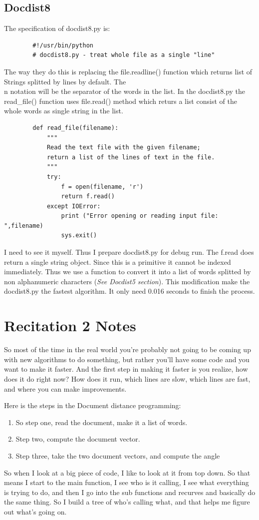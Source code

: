 \documentclass{article}
\begin{document}
    \subsection{Docdist8}
    The specification of docdist8.py is:
    \begin{lstlisting}
        #!/usr/bin/python
        # docdist8.py - treat whole file as a single "line"
    \end{lstlisting}
    The way they do this is replacing the file.readline() function which returns list of Strings splitted by lines by default.
    The \\n notation will be the separator of the words in the list. 
    In the docdist8.py the read\_file() function uses file.read() method which returs a list consist of the whole words as single string in the list. 
    \begin{lstlisting}
        def read_file(filename):
            """ 
            Read the text file with the given filename;
            return a list of the lines of text in the file.
            """
            try:
                f = open(filename, 'r')
                return f.read()
            except IOError:
                print ("Error opening or reading input file: ",filename)
                sys.exit()
    \end{lstlisting}
    I need to see it myself. Thus I prepare docdist8.py for debug run. 
    The f.read does return a single string object. Since this is a primitive it cannot be indexed immediately.
    Thus we use a function to convert it into a list of words splitted by non alphanumeric characters (\textit{See Docdist5 section}).
    This modification make the docdist8.py the fastest algorithm. It only need 0.016 seconds to finish the process.

    \section{Recitation 2 Notes}
    So most of the time in the real world you're probably not going to be coming up with new algorithms to do something, but rather you'll have some code and you want to make it faster. 
    And the first step in making it faster is you realize, how does it do right now? How does it run, which lines are slow, which lines are fast, and where you can make improvements.

    Here is the steps in the Document distance programming:
    \begin{enumerate}
        \item So step one, read the document, make it a list of words. 
        \item Step two, compute the document vector. 
        \item Step three, take the two document vectors, and compute the angle
    \end{enumerate}
    So when I look at a big piece of code, I like to look at it from top down. 
    So that means I start to the main function, I see who is it calling, I see what everything is trying to do, and then I go into the sub functions and recurves and basically do the same thing. 
    So I build a tree of who's calling what, and that helps me figure out what's going on.
\end{document}
